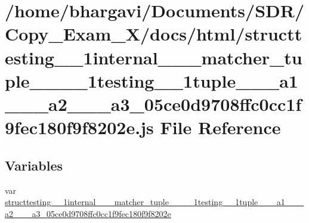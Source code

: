 \hypertarget{structtesting__1__1internal__1__1__matcher__tuple__3__01__1__1testing__1__1tuple__3__01__a1__00_4b5e088224f758d13e1d828d3f2abe2e}{}\section{/home/bhargavi/\+Documents/\+S\+D\+R/\+Copy\+\_\+\+Exam\+\_\+X/docs/html/structtesting\+\_\+\_\+1internal\+\_\+\_\+\_\+matcher\+\_\+tuple\+\_\+\_\+\_\+\_\+1testing\+\_\+\_\+1tuple\+\_\+\_\+\_\+a1\+\_\+\_\+\_\+a2\+\_\+\_\+\_\+a3\+\_\+05ce0d9708ffc0cc1f9fec180f9f8202e.js File Reference}
\label{structtesting__1__1internal__1__1__matcher__tuple__3__01__1__1testing__1__1tuple__3__01__a1__00_4b5e088224f758d13e1d828d3f2abe2e}
\subsection*{Variables}
\begin{DoxyCompactItemize}
\item 
var \hyperlink{structtesting__1__1internal__1__1__matcher__tuple__3__01__1__1testing__1__1tuple__3__01__a1__00_4b5e088224f758d13e1d828d3f2abe2e_a8f962848e1766769874ca86a818a1144}{structtesting\+\_\+\_\+1internal\+\_\+\_\+\_\+matcher\+\_\+tuple\+\_\+\_\+\_\+\_\+1testing\+\_\+\_\+1tuple\+\_\+\_\+\_\+a1\+\_\+\_\+\_\+a2\+\_\+\_\+\_\+a3\+\_\+05ce0d9708ffc0cc1f9fec180f9f8202e}
\end{DoxyCompactItemize}


